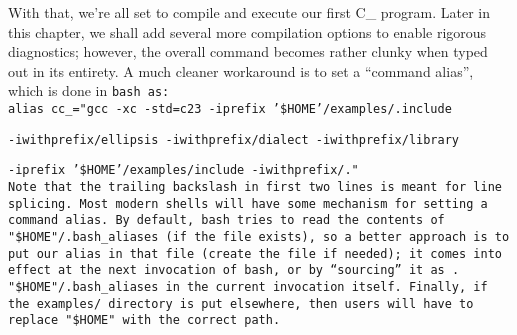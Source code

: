 With that, we're all set to compile and execute our first C\_ program.
Later in this chapter, we shall add several more compilation
options to enable rigorous diagnostics; however,
the overall command becomes rather clunky when typed out in its entirety.
A much cleaner workaround is to set a ``command alias'',
which is done in \tt{bash} as:\\

\tt{alias cc_="gcc -xc -std=c23 -iprefix '\$HOME'/examples/.include \\}

\tt{-iwithprefix/ellipsis -iwithprefix/dialect -iwithprefix/library \\}

\tt{-iprefix '\$HOME'/examples/include -iwithprefix/."}\\

Note that the trailing backslash in first
two lines is meant for line splicing.
Most modern shells will have some mechanism for setting a command alias.
By default, \tt{bash} tries to read the contents of \tt{"\$HOME"/.bash_aliases}
(if the file exists), so a better approach is to put
our alias in that file (create the file if needed);
it comes into effect at the next invocation of \tt{bash}, or by ``sourcing''
it as \tt{. "\$HOME"/.bash_aliases} in the current invocation itself.
Finally, if the \tt{examples/} directory is put elsewhere,
then users will have to replace \tt{"\$HOME"} with the correct path.
